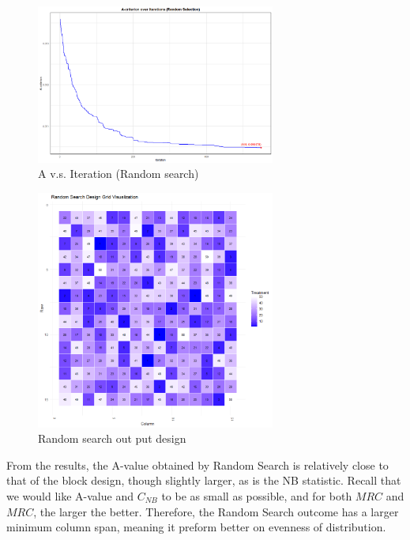 \documentclass[
  a4paper,
  oneside,
  openany,
  12pt,
  onecolumn]{book}
\theoremstyle{definition}
\theoremstyle{plain}
\theoremstyle{remark}
\begin{document}
\begin{figure}[H]

{\centering \includegraphics[width=0.7\textwidth,height=\textheight]{images/Rplots/random selection example.png}

}

\caption{A v.s. Iteration (Random search)}

\end{figure}%
\begin{figure}[H]

{\centering \includegraphics[width=0.7\textwidth,height=\textheight]{images/Rplots/Random search design visualization.png}

}

\caption{Random search out put design}

\end{figure}%

From the results, the A-value obtained by Random Search is relatively
close to that of the block design, though slightly larger, as is the NB
statistic. Recall that we would like A-value and \(C_{NB}\) to be as
small as possible, and for both \(MRC\) and \(MRC\), the larger the
better. Therefore, the Random Search outcome has a larger minimum column
span, meaning it preform better on evenness of distribution.
\end{document}
